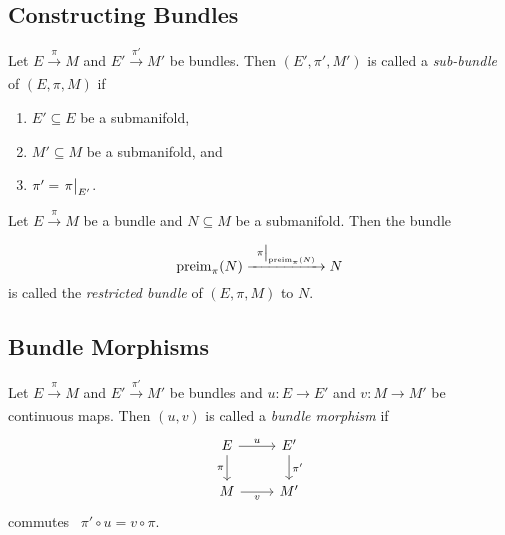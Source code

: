 \subsection{Constructing Bundles}

\begin{definition}
	Let \(E \xrightarrow[]{\ \pi\ } M\) and \(E' \xrightarrow[]{\ \pi'\ } M'\) be bundles. Then \((E', \pi', M')\) is called a \emph{sub-bundle} of \((E, \pi, M)\) if
	\begin{enumerate}
		\item \(E' \subseteq E\) be a submanifold,
		\item \(M' \subseteq M\) be a submanifold, and
		\item \(\pi' = \eval{\pi}_{E'}\).
	\end{enumerate}
\end{definition}

\begin{definition}
	Let \(E \xrightarrow[]{\ \pi\ } M\) be a bundle and \(N \subseteq M\) be a submanifold. Then the bundle
	\begin{equation}
		\preimg_{\pi}(N) \xrightarrow[]{\ \eval{\pi}_{\preimg_{\pi}(N)}\ } N
	\end{equation}
	is called the \emph{restricted bundle} of \((E, \pi, M)\) to \(N\).
\end{definition}

\subsection{Bundle Morphisms}

\begin{definition}\label{def:bundle-morphism}
	Let \(E \xrightarrow[]{\ \pi\ } M\) and \(E' \xrightarrow[]{\ \pi'\ } M'\) be bundles and \(u: E \to E'\) and \(v: M \to M'\) be continuous maps. Then \((u, v)\) is called a \emph{bundle morphism} if
	\begin{equation}
		\begin{tikzcd}
			E \arrow[r, "u"] \arrow[d, "\pi"'] & E' \arrow[d, "\pi'"] \\
			M \arrow[r, "v"']                  & M'
		\end{tikzcd}
	\end{equation}
	commutes \ie\ \(\pi' \circ u = v \circ \pi\).
\end{definition}

